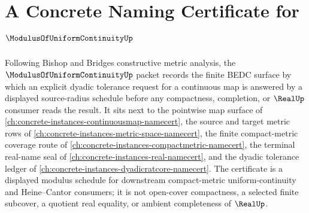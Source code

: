 \chapter{A Concrete Naming Certificate for $\ModulusOfUniformContinuityUp$}
\label{ch:concrete-instances-modulus-of-uniform-continuity-namecert}

Following Bishop and Bridges constructive metric analysis, the $\ModulusOfUniformContinuityUp$ packet records the finite BEDC surface by which an explicit dyadic tolerance request for a continuous map is answered by a displayed source-radius schedule before any compactness, completion, or $\RealUp$ consumer reads the result. It sits next to the pointwise map surface of \autoref{ch:concrete-instances-continuousmap-namecert}, the source and target metric rows of \autoref{ch:concrete-instances-metric-space-namecert}, the finite compact-metric coverage route of \autoref{ch:concrete-instances-compactmetric-namecert}, the terminal real-name seal of \autoref{ch:concrete-instances-real-namecert}, and the dyadic tolerance ledger of \autoref{ch:concrete-instances-dyadicratcore-namecert}. The certificate is a displayed modulus schedule for downstream compact-metric uniform-continuity and Heine--Cantor consumers; it is not open-cover compactness, a selected finite subcover, a quotient real equality, or ambient completeness of $\RealUp$.

